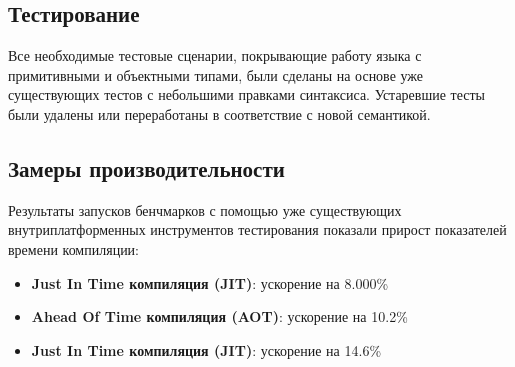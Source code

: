 \subsection{Тестирование}
Все необходимые тестовые сценарии, покрывающие работу языка с примитивными и объектными типами, были сделаны на основе уже существующих тестов с небольшими правками синтаксиса. Устаревшие тесты были удалены или переработаны в соответствие с новой семантикой.

\subsection{Замеры производительности}
Результаты запусков бенчмарков с помощью уже существующих внутриплатформенных инструментов тестирования показали прирост показателей времени компиляции:
\begin{itemize}[label={--}]
    \item \textbf{Just In Time компиляция (JIT)}: ускорение на 8.000\%
    \item \textbf{Ahead Of Time компиляция (AOT)}: ускорение на 10.2\%
    \item \textbf{Just In Time компиляция (JIT)}: ускорение на 14.6\%
\end{itemize}

\newpage